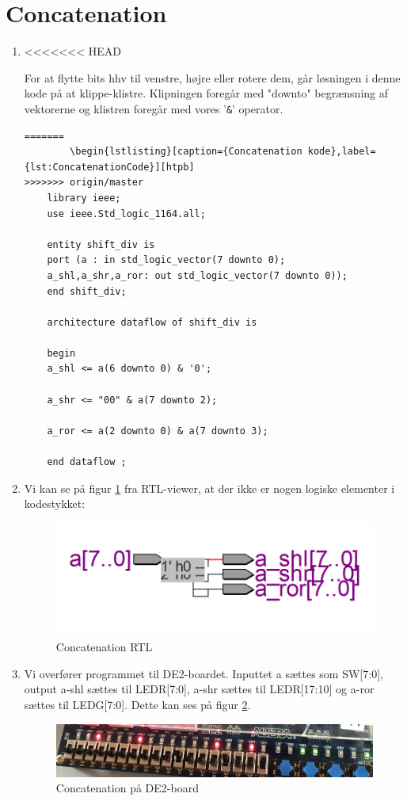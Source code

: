 \newpage
\section{Concatenation}
\begin{enumerate}
	\item[1)]
<<<<<<< HEAD

	For at flytte bits hhv til venstre, højre eller rotere dem, går løsningen i denne kode på at klippe-klistre. Klipningen foregår med "downto" begrænsning af vektorerne og klistren foregår med vores '\verb|&|' operator.
		\begin{lstlisting}[caption={Concatenation kode},label={lst:ConcatenationCode}]
=======
		\begin{lstlisting}[caption={Concatenation kode},label={lst:ConcatenationCode}][htpb]
>>>>>>> origin/master
	library ieee;
	use ieee.Std_logic_1164.all;
	
	entity shift_div is
	port (a : in std_logic_vector(7 downto 0);
	a_shl,a_shr,a_ror: out std_logic_vector(7 downto 0));
	end shift_div; 
	
	architecture dataflow of shift_div is
	
	begin 
	a_shl <= a(6 downto 0) & '0';
	
	a_shr <= "00" & a(7 downto 2);
	
	a_ror <= a(2 downto 0) & a(7 downto 3);
	
	end dataflow ;

		\end{lstlisting}
	\item[2)]
Vi kan se på figur \ref{fig:concatenationRTL} fra RTL-viewer, at der ikke er nogen logiske elementer i kodestykket:
	\begin{figure}[H]
		\centering
		\includegraphics[scale=0.5]{pictures/Oevelse3/Concatenation_RTL.png}
		\caption{Concatenation RTL}
		\label{fig:concatenationRTL}
	\end{figure}

	
	\item[3)]
Vi overfører programmet til DE2-boardet. Inputtet a sættes som SW[7:0], output a-shl sættes til LEDR[7:0], a-shr sættes til LEDR[17:10] og a-ror sættes til LEDG[7:0]. Dette kan ses på figur \ref{fig:concatenation_DE2board}.

	\begin{figure}[H]
		\centering
		\includegraphics[scale=0.23]{pictures/Oevelse3/Concatenation_DE2board.jpg}
		\caption{Concatenation på DE2-board}
		\label{fig:concatenation_DE2board}
	\end{figure}

\end{enumerate}
\pagebreak